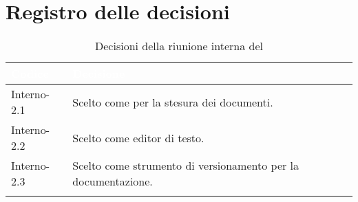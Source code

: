 \section{Registro delle decisioni}
{
\renewcommand{\arraystretch}{1.5}
\centering
\begin{longtable}{C{3cm} C{9cm}}
\textcolor{white}{\textbf{Codice}}&
\textcolor{white}{\textbf{Decisione}}\\	
\endhead
		
Interno-2.1 & Scelto  come  per la stesura dei documenti.\\

Interno-2.2 & Scelto  come editor di testo.\\

Interno-2.3 & Scelto  come strumento di versionamento per la documentazione.\\
		
\caption{Decisioni della riunione interna del \Data{}}
\end{longtable}
}
